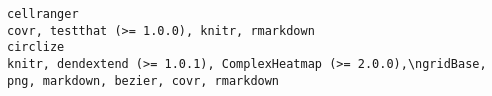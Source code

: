 \documentclass[
  letterpaper,
  DIV=11,
  numbers=noendperiod]{scrreprt}
\begin{document}
\begin{verbatim}
cellranger                                                                                                                                                                                                                                                                                                                                                                                                                                                                                                                                                                                                                                                                                                                                                                                                                                                                                                                                                                                                                                                                                                                                                                                                                                                        covr, testthat (>= 1.0.0), knitr, rmarkdown
circlize                                                                                                                                                                                                                                                                                                                                                                                                                                                                                                                                                                                                                                                                                                                                                                                                                                                                                                                                                                                                                                                                                                                                                                                           knitr, dendextend (>= 1.0.1), ComplexHeatmap (>= 2.0.0),\ngridBase, png, markdown, bezier, covr, rmarkdown

\end{verbatim}
\end{document}
